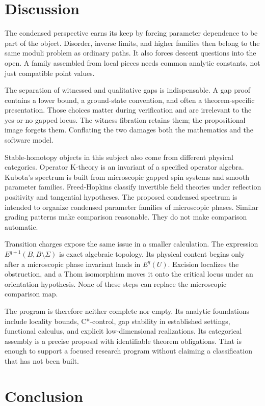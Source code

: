 \documentclass[12pt]{article}
\theoremstyle{definition}
\theoremstyle{remark}
\begin{document}
\section{Discussion}

The condensed perspective earns its keep by forcing parameter dependence to
be part of the object.  Disorder, inverse limits, and higher families then
belong to the same moduli problem as ordinary paths.  It also forces descent
questions into the open.  A family assembled from local pieces needs common
analytic constants, not just compatible point values.

The separation of witnessed and qualitative gaps is indispensable.  A gap
proof contains a lower bound, a ground-state convention, and often a
theorem-specific presentation.  Those choices matter during verification
and are irrelevant to the yes-or-no gapped locus.  The witness fibration
retains them; the propositional image forgets them.  Conflating the two
damages both the mathematics and the software model.

Stable-homotopy objects in this subject also come from different physical
categories.  Operator K-theory is an invariant of a specified
operator algebra.  Kubota's spectrum is built from microscopic gapped spin
systems and smooth parameter families.  Freed-Hopkins classify invertible
field theories under reflection positivity and tangential hypotheses.  The
proposed condensed spectrum is intended to organize condensed parameter
families of microscopic phases.  Similar grading patterns make comparison
reasonable.  They do not make comparison automatic.

Transition charges expose the same issue in a smaller calculation.  The expression
$E^{q+1}(B,B\setminus\Sigma)$ is exact algebraic topology.  Its physical
content begins only after a microscopic phase invariant lands in $E^q(U)$.
Excision localizes the obstruction, and a Thom isomorphism moves it onto the
critical locus under an orientation hypothesis.  None of these steps can
replace the microscopic comparison map.

The program is therefore neither complete nor empty.  Its analytic
foundations include locality bounds, C*-control, gap stability in established
settings, functional calculus, and explicit low-dimensional realizations.
Its categorical assembly is a precise proposal with identifiable theorem
obligations.  That is enough to support a focused research program without
claiming a classification that has not been built.

\section{Conclusion}
\end{document}
